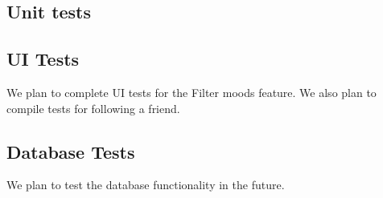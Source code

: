 \subsection{Unit tests}

\subsection{UI Tests}
We plan to complete UI tests for the Filter moods feature. 
We also plan to compile tests for following a friend. 

\lipsum[2]

\subsection{Database Tests}
We plan to test the database functionality in the future. 

\lipsum[3]
